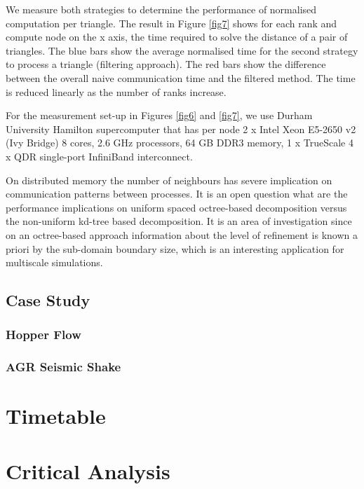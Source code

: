 \documentclass[times,12pt]{article}
\begin{document}
We measure both strategies to determine the performance of normalised computation per triangle. The result in Figure \ref{fig7} shows for each rank and compute node on the x axis, the time required to solve the distance of a pair of triangles. The blue bars show the average normalised time for the second strategy to process a triangle (filtering approach). The red bars show the difference between the overall naive communication time and the filtered method. The time is reduced linearly as the number of ranks increase.

For the measurement set-up in Figures \ref{fig6} and \ref{fig7}, we use Durham University Hamilton supercomputer that has per node 2 x Intel Xeon E5-2650 v2 (Ivy Bridge) 8 cores, 2.6 GHz processors, 64 GB DDR3 memory, 1 x TrueScale 4 x QDR single-port InfiniBand interconnect.



On distributed memory the number of neighbours has severe implication on communication patterns between processes. It is an open question what are the performance implications on uniform spaced octree-based decomposition versus the non-uniform kd-tree based decomposition. It is an area of investigation since on an octree-based approach information about the level of refinement is known a priori by the sub-domain boundary size, which is an interesting application for multiscale simulations. 





\subsection{Case Study}

\subsubsection{Hopper Flow}

\subsubsection{AGR Seismic Shake}



\section{Timetable}



\section{Critical Analysis}
\end{document}
